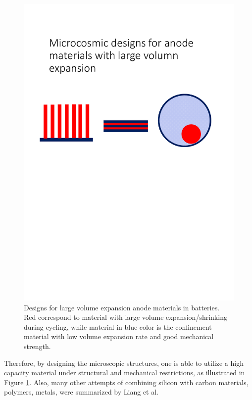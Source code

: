 \begin{figure}  
\centering
\includegraphics[width=\textwidth]{figures/figure1_silibdesign}
\caption[Designs for large volume expansion anode materials]{Designs for large volume expansion anode materials in batteries. Red correspond to material with large volume expansion/shrinking during cycling, while material in blue color is the confinement material with low volume expansion rate and good mechanical strength. 
\label{fig:1silibdesign}}
\end{figure}
 
Therefore, by designing the microscopic structures, one is able to utilize a high capacity material under structural and mechanical restrictions, as illustrated in Figure \ref{fig:1silibdesign}. Also, many other attempts of combining silicon with carbon materials,  polymers,  metals, were summarized by Liang et al.\cite{Liang2014} 
 
